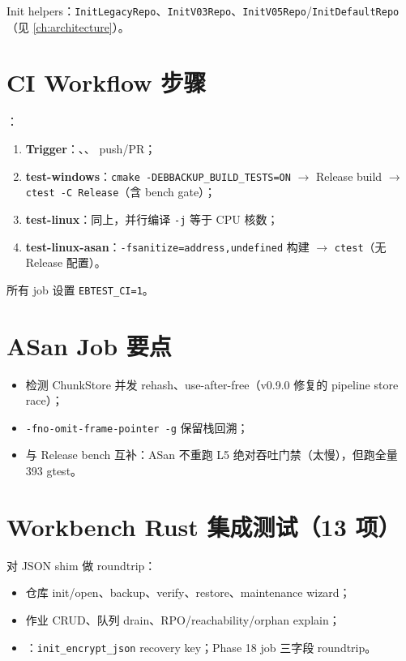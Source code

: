 Init helpers：\texttt{InitLegacyRepo}、\texttt{InitV03Repo}、\texttt{InitV05Repo}/\texttt{InitDefaultRepo}（见 \cref{ch:architecture}）。

\section{CI Workflow 步骤}

：

\begin{enumerate}
  \item \textbf{Trigger}：、、 push/PR；
  \item \textbf{test-windows}：\texttt{cmake -DEBBACKUP\_BUILD\_TESTS=ON} $\rightarrow$ Release build $\rightarrow$ \texttt{ctest -C Release}（含 bench gate）；
  \item \textbf{test-linux}：同上，并行编译 \texttt{-j} 等于 CPU 核数；
  \item \textbf{test-linux-asan}：\texttt{-fsanitize=address,undefined} 构建 $\rightarrow$ \texttt{ctest}（无 Release 配置）。
\end{enumerate}

所有 job 设置 \texttt{EBTEST\_CI=1}。

\section{ASan Job 要点}

\begin{itemize}[nosep]
  \item 检测 ChunkStore 并发 rehash、use-after-free（v0.9.0 修复的 pipeline store race）；
  \item \texttt{-fno-omit-frame-pointer -g} 保留栈回溯；
  \item 与 Release bench 互补：ASan 不重跑 L5 绝对吞吐门禁（太慢），但跑全量 393 gtest。
\end{itemize}

\section{Workbench Rust 集成测试（13 项）}

 对  JSON shim 做 roundtrip：

\begin{itemize}[nosep]
  \item 仓库 init/open、backup、verify、restore、maintenance wizard；
  \item 作业 CRUD、队列 drain、RPO/reachability/orphan explain；
  \item {}：\texttt{init\_encrypt\_json} recovery key；Phase 18 job 三字段 roundtrip。
\end{itemize}

